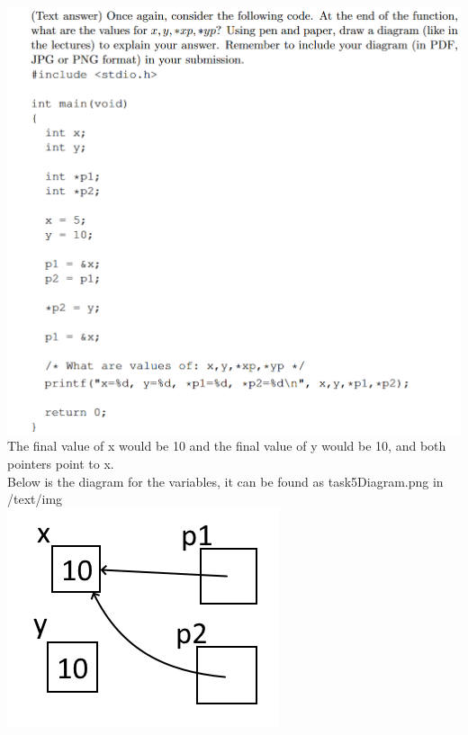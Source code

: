 \documentclass{article}
\begin{document}
\section{}
\includegraphics[width=\linewidth, keepaspectratio=true]{task5}
\vspace{2pt}\\
The final value of x would be 10 and the final value of y would be 10, and both pointers point to x.\\
Below is the diagram for the variables, it can be found as task5Diagram.png in /text/img\\
\includegraphics[scale=0.7, keepaspectratio=true]{task5Diagram}
\end{document}
